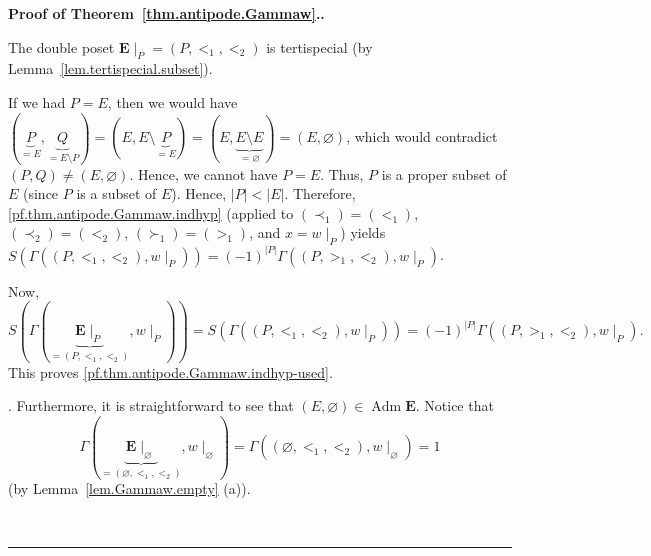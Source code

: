 \documentclass[numbers=enddot,12pt,final,onecolumn,notitlepage,abstracton]{scrartcl}
\theoremstyle{definition}
\newenvironment{proof}[1][Proof]{\noindent\textbf{#1.} }{\ \rule{0.5em}{0.5em}}
\newenvironment{verlong}{}{}
\newcommand{\Adm}{\operatorname{Adm}}
\newcommand{\EE}{{\mathbf{E}}}
\begin{document}
\begin{proof}[Proof of Theorem~\ref{thm.antipode.Gammaw}.]
\begin{verlong}
{The double poset $\EE\mid_P = \left(P, <_1, <_2\right)$
is tertispecial (by Lemma~\ref{lem.tertispecial.subset}).

If we had $P = E$, then we would have
$\left(\underbrace{P}_{= E}, \underbrace{Q}_{= E \setminus P}\right)
= \left(E, E \setminus \underbrace{P}_{= E}\right)
= \left(E, \underbrace{E \setminus E}_{= \varnothing}\right)
= \left(E, \varnothing\right)$, which would contradict
$\left(P, Q\right) \neq \left(E, \varnothing\right)$.
Hence, we cannot have $P = E$. Thus, $P$ is a proper
subset of $E$ (since $P$ is a subset of $E$). Hence,
$\left|P\right| < \left|E\right|$. Therefore,
\eqref{pf.thm.antipode.Gammaw.indhyp} (applied to
$\left(\prec_1\right) = \left(<_1\right)$,
$\left(\prec_2\right) = \left(<_2\right)$,
$\left(\succ_1\right) = \left(>_1\right)$,
and $x = w\mid_P$) yields
$S\left(\Gamma\left(\left(P, <_1, <_2\right), w\mid_P\right)\right)
= \left(-1\right)^{\left|P\right|}
\Gamma\left(\left(P, >_1, <_2\right), w\mid_P\right)$.

Now,
\[
S\left(\Gamma\left(\underbrace{\EE\mid_P}_{= \left(P, <_1, <_2\right)}, w\mid_P\right)\right)
= S\left(\Gamma\left(\left(P, <_1, <_2\right), w\mid_P\right)\right)
= \left(-1\right)^{\left|P\right|}
\Gamma\left(\left(P, >_1, <_2\right), w\mid_P\right) .
\]
This proves \eqref{pf.thm.antipode.Gammaw.indhyp-used}.}.
Furthermore, it is straightforward to see that
$\left(E, \varnothing\right) \in \Adm \EE$.
Notice that
\[
\Gamma\left(\underbrace{\EE\mid_\varnothing}_{= \left(\varnothing, <_1, <_2\right)},
            w\mid_\varnothing\right)
=\Gamma\left(\left(\varnothing, <_1, <_2\right), w\mid_\varnothing\right)
=1
\]
(by Lemma~\ref{lem.Gammaw.empty} (a)).
\end{verlong}


\end{proof}
\end{document}
